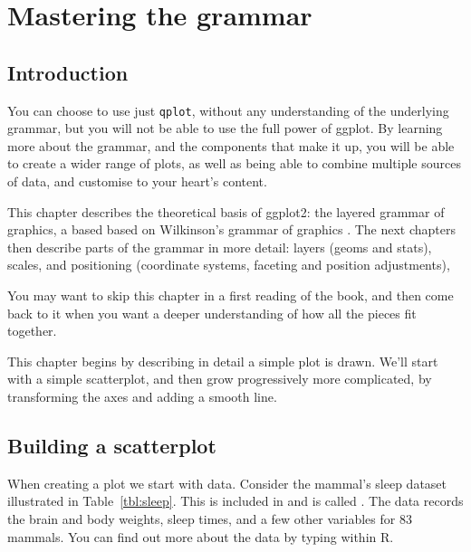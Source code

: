 

\chapter{Mastering the grammar}
\label{cha:mastery}



\section{Introduction}\label{sec:introduction}

You can choose to use just {\tt qplot}, without any understanding of the underlying grammar, but you will not be able to use the full power of ggplot.  By learning more about the grammar, and the components that make it up, you will be able to create a wider range of plots, as well as being able to combine multiple sources of data, and customise to your heart's content.

This chapter describes the theoretical basis of ggplot2: the layered grammar of graphics, a based based on Wilkinson's grammar of graphics \citep{wilkinson:2006}.  The next chapters then describe parts of the grammar in more detail: layers (geoms and stats), scales, and positioning (coordinate systems, faceting and position adjustments),

You may want to skip this chapter in a first reading of the book, and then come back to it when you want a deeper understanding of how all the pieces fit together.

This chapter begins by describing in detail a simple plot is drawn.  We'll start with a simple scatterplot, and then grow progressively more complicated, by transforming the axes and adding a smooth line.

\section{Building a scatterplot}
\label{sec:building_a_plot}

When creating a plot we start with data.  Consider the mammal's sleep dataset illustrated in Table~\ref{tbl:sleep}.  This is included in \ggplot and is called .  The data records the brain and body weights, sleep times, and a few other variables for 83 mammals.   You can find out more about the data by typing  within R. 

